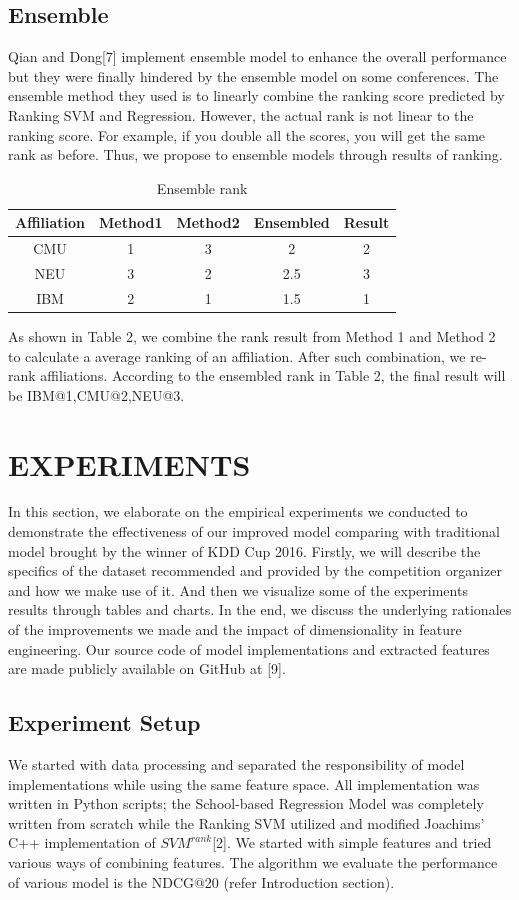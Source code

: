 \documentclass[letterpaper]{article}
\begin{document}
\subsection{Ensemble}
 Qian and Dong[7] implement ensemble model to enhance the overall performance but they were finally hindered by the ensemble model on some conferences. The ensemble method they used is to linearly combine the ranking score predicted by Ranking SVM and Regression. However, the actual rank is not linear to the ranking score. For example, if you double all the scores, you will get the same rank as before. Thus, we propose to ensemble models through results of ranking.
 
 \begin{table}[h]
 \centering
 \caption{Ensemble rank\newline}
 \begin{tabular}{c|c|c|c|c}
    \hline
      Affiliation& Method1& Method2& Ensembled &Result\\
    \hline 
      CMU&1&3&2&2\\
    \hline
      NEU&3&2&2.5&3\\
    \hline
      IBM&2&1&1.5&1\\
    \hline
 \end{tabular}
 \end{table}
As shown in Table 2, we combine the rank result from Method 1 and Method 2 to calculate a average ranking of an affiliation. After such combination, we re-rank affiliations. According to the ensembled rank in Table 2, the final result will be IBM@1,CMU@2,NEU@3. 

\section{EXPERIMENTS}
In this section, we elaborate on the empirical experiments we conducted to demonstrate the effectiveness of our improved model comparing with traditional model brought by the winner of KDD Cup 2016. Firstly, we will describe the specifics of the dataset recommended and provided by the competition organizer and how we make use of it. And then we visualize some of the experiments results through tables and charts. In the end, we discuss the underlying rationales of the improvements we made and the impact of dimensionality in feature engineering. Our source code of model implementations and extracted features are made publicly available on GitHub at [9].

\subsection{Experiment Setup}
We started with data processing and separated the responsibility of model implementations while using the same feature space. All implementation was written in Python scripts; the School-based Regression Model was completely written from scratch while the Ranking SVM utilized and modified Joachims' C++ implementation of $SVM^{rank}$[2].
We started with simple features and tried various ways of combining features. The algorithm we evaluate the performance of various model is the NDCG@20 (refer Introduction section).
\end{document}
